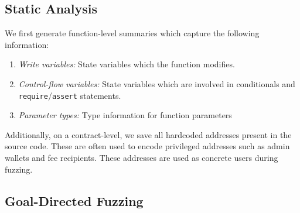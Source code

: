 \subsection{Static Analysis}
We first generate function-level summaries which capture the following information:
\begin{enumerate}
    \item \textit{Write variables:} State variables which the function modifies.
    \item \textit{Control-flow variables:} State variables which are involved in conditionals and \texttt{require}/\texttt{assert} statements.
    \item \textit{Parameter types:} Type information for function parameters
\end{enumerate}

Additionally, on a contract-level, we save all hardcoded addresses present in the source code.
These are often used to encode privileged addresses such as admin wallets and fee recipients.
These addresses are used as concrete users during fuzzing.

\subsection{Goal-Directed Fuzzing}

